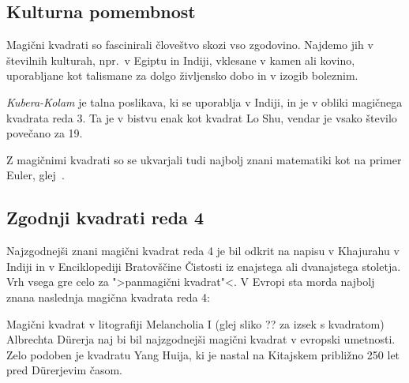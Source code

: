 \documentclass[a4paper,12pt]{article}
\newcommand{\pojem}[1]{\emph{#1}}
\begin{document}


\subsection{Kulturna pomembnost}

Magični kvadrati so fascinirali človeštvo skozi vso zgodovino. Najdemo jih
v številnih kulturah, npr.\ v Egiptu in Indiji, vklesane v kamen ali
kovino, uporabljane kot talismane za dolgo življensko dobo in v
izogib boleznim.

\pojem{Kubera-Kolam} je talna poslikava, ki se uporablja v Indiji, in je v
obliki magičnega kvadrata reda 3. Ta je v bistvu enak kot kvadrat
Lo Shu, vendar je vsako število povečano za 19.


Z magičnimi kvadrati so se ukvarjali tudi najbolj znani matematiki kot na
primer Euler, glej~\cite{euler}. %


\subsection{Zgodnji kvadrati reda 4}

Najzgodnejši znani magični kvadrat reda 4 je bil odkrit na napisu
v Khajurahu v Indiji in v Enciklopediji Bratovščine Čistosti iz enajstega
ali dvanajstega stoletja. Vrh vsega gre celo za ">panmagični kvadrat"<.
V Evropi sta morda najbolj znana naslednja magična kvadrata reda 4:

Magični kvadrat v litografiji Melancholia I (glej sliko ??
za izsek s kvadratom) Albrechta Dürerja naj bi bil najzgodnejši magični kvadrat
v evropski umetnosti. Zelo podoben je kvadratu Yang Huija, ki je nastal na Kitajskem
približno 250 let pred Dürerjevim časom. %
\end{document}

